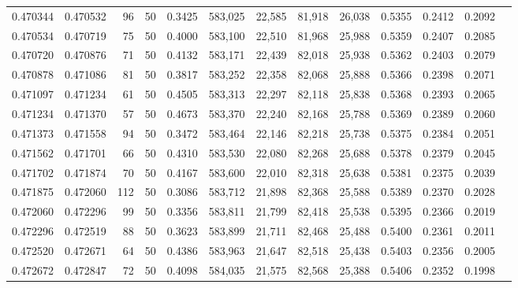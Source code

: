\begin{tabular}{rrrrrrrrrrrrr}
0.470344 & 0.470532 &    96 &  50 &                                     0.3425 & 583,025 &  22,585 &  81,918 &  26,038 & 0.5355 & 0.2412 & 0.2092 \\
0.470534 & 0.470719 &    75 &  50 &                                     0.4000 & 583,100 &  22,510 &  81,968 &  25,988 & 0.5359 & 0.2407 & 0.2085 \\
0.470720 & 0.470876 &    71 &  50 &                                     0.4132 & 583,171 &  22,439 &  82,018 &  25,938 & 0.5362 & 0.2403 & 0.2079 \\
0.470878 & 0.471086 &    81 &  50 &                                     0.3817 & 583,252 &  22,358 &  82,068 &  25,888 & 0.5366 & 0.2398 & 0.2071 \\
0.471097 & 0.471234 &    61 &  50 &                                     0.4505 & 583,313 &  22,297 &  82,118 &  25,838 & 0.5368 & 0.2393 & 0.2065 \\
0.471234 & 0.471370 &    57 &  50 &                                     0.4673 & 583,370 &  22,240 &  82,168 &  25,788 & 0.5369 & 0.2389 & 0.2060 \\
0.471373 & 0.471558 &    94 &  50 &                                     0.3472 & 583,464 &  22,146 &  82,218 &  25,738 & 0.5375 & 0.2384 & 0.2051 \\
0.471562 & 0.471701 &    66 &  50 &                                     0.4310 & 583,530 &  22,080 &  82,268 &  25,688 & 0.5378 & 0.2379 & 0.2045 \\
0.471702 & 0.471874 &    70 &  50 &                                     0.4167 & 583,600 &  22,010 &  82,318 &  25,638 & 0.5381 & 0.2375 & 0.2039 \\
0.471875 & 0.472060 &   112 &  50 &                                     0.3086 & 583,712 &  21,898 &  82,368 &  25,588 & 0.5389 & 0.2370 & 0.2028 \\
0.472060 & 0.472296 &    99 &  50 &                                     0.3356 & 583,811 &  21,799 &  82,418 &  25,538 & 0.5395 & 0.2366 & 0.2019 \\
0.472296 & 0.472519 &    88 &  50 &                                     0.3623 & 583,899 &  21,711 &  82,468 &  25,488 & 0.5400 & 0.2361 & 0.2011 \\
0.472520 & 0.472671 &    64 &  50 &                                     0.4386 & 583,963 &  21,647 &  82,518 &  25,438 & 0.5403 & 0.2356 & 0.2005 \\
0.472672 & 0.472847 &    72 &  50 &                                     0.4098 & 584,035 &  21,575 &  82,568 &  25,388 & 0.5406 & 0.2352 & 0.1998 \\

\end{tabular}
